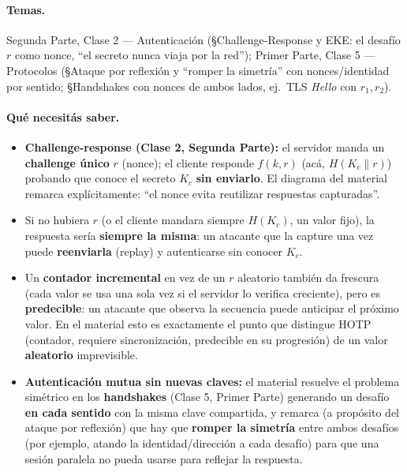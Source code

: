 \paragraph{Temas.}
Segunda Parte, Clase 2 --- Autenticación (\S Challenge-Response y EKE: el desafío
$r$ como nonce, ``el secreto nunca viaja por la red''); Primer Parte, Clase 5 ---
Protocolos (\S Ataque por reflexión y ``romper la simetría'' con nonces/identidad
por sentido; \S Handshakes con nonces de ambos lados, ej.\ TLS \emph{Hello} con
$r_1, r_2$).

\paragraph{Qué necesitás saber.}
\begin{itemize}
  \item \textbf{Challenge-response (Clase 2, Segunda Parte):} el servidor manda un
  \textbf{challenge único} $r$ (nonce); el cliente responde $f(k,r)$ (acá,
  $H(K_c\|r)$) probando que conoce el secreto $K_c$ \textbf{sin enviarlo}. El
  diagrama del material remarca explícitamente: ``el nonce evita reutilizar
  respuestas capturadas''.
  \item Si no hubiera $r$ (o el cliente mandara siempre $H(K_c)$, un valor fijo), la
  respuesta sería \textbf{siempre la misma}: un atacante que la capture una vez
  puede \textbf{reenviarla} (replay) y autenticarse sin conocer $K_c$.
  \item Un \textbf{contador incremental} en vez de un $r$ aleatorio también da
  frescura (cada valor se usa una sola vez si el servidor lo verifica creciente),
  pero es \textbf{predecible}: un atacante que observa la secuencia puede anticipar
  el próximo valor. En el material esto es exactamente el punto que distingue HOTP
  (contador, requiere sincronización, predecible en su progresión) de un valor
  \textbf{aleatorio} imprevisible.
  \item \textbf{Autenticación mutua sin nuevas claves:} el material resuelve el
  problema simétrico en los \textbf{handshakes} (Clase 5, Primer Parte) generando
  un desafío \textbf{en cada sentido} con la misma clave compartida, y remarca
  (a propósito del ataque por reflexión) que hay que \textbf{romper la simetría}
  entre ambos desafíos (por ejemplo, atando la identidad/dirección a cada
  desafío) para que una sesión paralela no pueda usarse para reflejar la
  respuesta.
\end{itemize}

